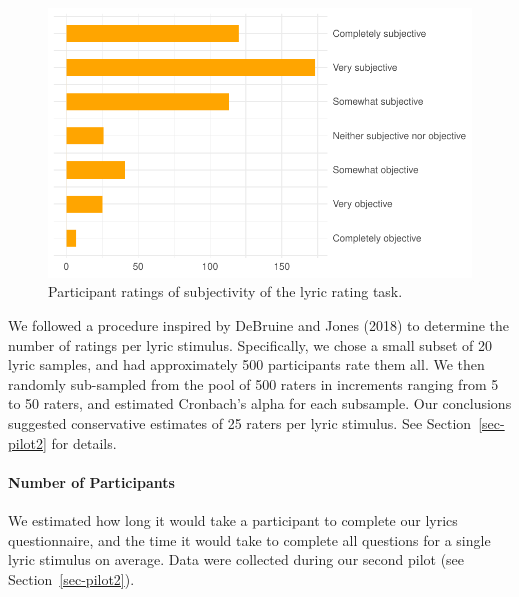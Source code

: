 \documentclass[
  letterpaper,
  DIV=11,
  numbers=noendperiod]{scrartcl}
\let\oldparagraph\paragraph
\renewcommand{\paragraph}[1]{\oldparagraph{#1}\mbox{}}
\begin{document}
\begin{figure}

{\centering \includegraphics{pre-registration_pdf_files/figure-pdf/fig-2-1.pdf}

}

\caption{\label{fig-2}Participant ratings of subjectivity of the lyric
rating task.}

\end{figure}

We followed a procedure inspired by DeBruine and Jones (2018) to
determine the number of ratings per lyric stimulus. Specifically, we
chose a small subset of 20 lyric samples, and had approximately 500
participants rate them all. We then randomly sub-sampled from the pool
of 500 raters in increments ranging from 5 to 50 raters, and estimated
Cronbach's alpha for each subsample. Our conclusions suggested
conservative estimates of 25 raters per lyric stimulus. See
Section~\ref{sec-pilot2} for details.

\hypertarget{number-of-participants}{%
\paragraph{Number of Participants}\label{number-of-participants}}

We estimated how long it would take a participant to complete our lyrics
questionnaire, and the time it would take to complete all questions for
a single lyric stimulus on average. Data were collected during our
second pilot (see Section~\ref{sec-pilot2}).
\end{document}
